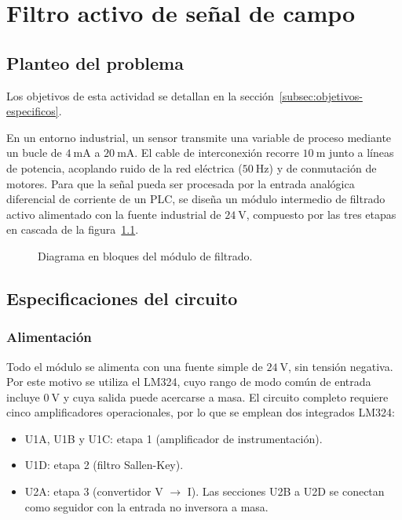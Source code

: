 \chapter{Filtro activo de señal de campo}
\label{chap:senal-campo}

\section{Planteo del problema}
\label{sec:campo-planteo}

Los objetivos de esta actividad se detallan en la sección~\ref{subsec:objetivos-especificos}.

En un entorno industrial, un sensor transmite una variable de proceso mediante un bucle de
$\SI{4}{\milli\ampere}$ a $\SI{20}{\milli\ampere}$. El cable de interconexión recorre $\SI{10}{\metre}$ junto a
líneas de potencia, acoplando ruido de la red eléctrica ($\SI{50}{\hertz}$) y de conmutación de motores. Para que la
señal pueda ser procesada por la entrada analógica diferencial de corriente de un PLC, se diseña un módulo
intermedio de filtrado activo alimentado con la fuente industrial de $\SI{24}{\volt}$, compuesto por las tres etapas
en cascada de la figura~\ref{fig:diagrama-bloques}.

\begin{figure}[H]
  \centering
  
  \caption{Diagrama en bloques del módulo de filtrado.}
  \label{fig:diagrama-bloques}
\end{figure}

\section{Especificaciones del circuito}
\label{sec:campo-especificaciones}

\subsection{Alimentación}
\label{subsec:campo-alimentacion}

Todo el módulo se alimenta con una fuente simple de $\SI{24}{\volt}$, sin tensión negativa. Por este motivo se
utiliza el LM324, cuyo rango de modo común de entrada incluye $\SI{0}{\volt}$ y cuya salida puede acercarse a masa.
El circuito completo requiere cinco amplificadores operacionales, por lo que se emplean dos integrados LM324:

\begin{itemize}
  \item U1A, U1B y U1C: etapa 1 (amplificador de instrumentación).
  \item U1D: etapa 2 (filtro Sallen-Key).
  \item U2A: etapa 3 (convertidor V $\rightarrow$ I). Las secciones U2B a U2D se conectan como seguidor con la entrada
    no inversora a masa.
\end{itemize}

